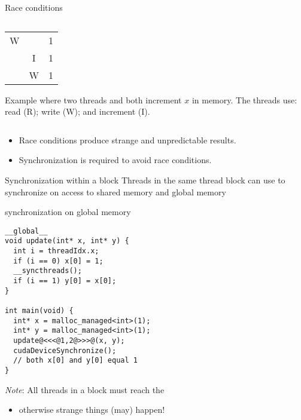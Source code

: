 \documentclass[aspectratio=43]{beamer}
\begin{document}
\begin{frame}[fragile]{Race conditions}
\begin{columns}[T]
\begin{column}[T]{0.55\textwidth}
\begin{center}
\begin{tabular}[]{|ccc|}
              W   &      &  1\\
                  &  I   &  1\\
                  &  W   &  1\\
            \hline
        \end{tabular}
        \end{center}
        \begin{center}
            \scriptsize
            Example where two threads  and  both increment $x$ in memory. The threads use: read (R); write (W); and increment (I).
        \end{center}
    \end{column}
\end{columns}

    \begin{itemize}
        \item Race conditions produce strange and unpredictable results.
        \item Synchronization is required to avoid race conditions.
    \end{itemize}
\end{frame}


\begin{frame}[fragile]{Synchronization within a block}
    Threads in the same thread block can use  to synchronize on access to shared memory and global memory

    \begin{code}{synchronization on global memory}
        \begin{lstlisting}[style=boxcudatiny]
__global__
void update(int* x, int* y) {
  int i = threadIdx.x;
  if (i == 0) x[0] = 1;
  __syncthreads();
  if (i == 1) y[0] = x[0];
}

int main(void) {
  int* x = malloc_managed<int>(1);
  int* y = malloc_managed<int>(1);
  update@<<<@1,2@>>>@(x, y);
  cudaDeviceSynchronize();
  // both x[0] and y[0] equal 1
}
        \end{lstlisting}
    \end{code}

    \emph{Note}: All threads in a block must reach the 
    \begin{itemize}
        \item otherwise strange things (may) happen!
    \end{itemize}
\end{frame}
\end{document}
